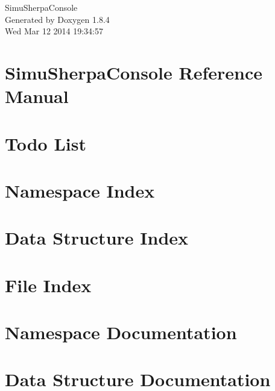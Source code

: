 \documentclass[twoside]{book}
\newcommand{\clearemptydoublepage}{%
  \newpage{\pagestyle{empty}\cleardoublepage}%
}
\begin{document}
\hypersetup{pageanchor=false}
\begin{titlepage}
\vspace*{7cm}
\begin{center}%
{\Large Simu\-Sherpa\-Console }\\
\vspace*{1cm}
{\large Generated by Doxygen 1.8.4}\\
\vspace*{0.5cm}
{\small Wed Mar 12 2014 19:34:57}\\
\end{center}
\end{titlepage}
\clearemptydoublepage
\tableofcontents
\clearemptydoublepage
{}
\hypersetup{pageanchor=true}

\chapter{Simu\-Sherpa\-Console Reference Manual}
\label{index}\hypertarget{index}{}
\chapter{Todo List}
\label{todo}
\hypertarget{todo}{}

\chapter{Namespace Index}

\chapter{Data Structure Index}

\chapter{File Index}

\chapter{Namespace Documentation}

\chapter{Data Structure Documentation}























\end{document}
